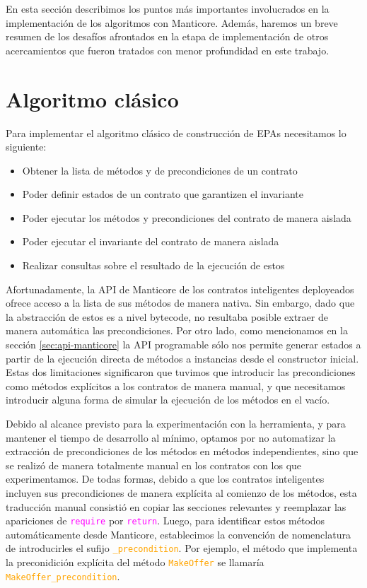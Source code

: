 En esta sección describimos los puntos más importantes involucrados en la implementación de los algoritmos con Manticore.
Además, haremos un breve resumen de los desafíos afrontados en la etapa de implementación de otros acercamientos que fueron tratados con menor profundidad en este trabajo.

\section{Algoritmo clásico}
Para implementar el algoritmo clásico de construcción de EPAs necesitamos lo siguiente:
\begin{itemize}
    \item Obtener la lista de métodos y de precondiciones de un contrato
    \item Poder definir estados de un contrato que garantizen el invariante
    \item Poder ejecutar los métodos y precondiciones del contrato de manera aislada
    \item Poder ejecutar el invariante del contrato de manera aislada
    \item Realizar consultas sobre el resultado de la ejecución de estos
\end{itemize}
Afortunadamente, la API de Manticore de los contratos inteligentes deployeados ofrece acceso a la lista de sus métodos de manera nativa.
Sin embargo, dado que la abstracción de estos es a nivel bytecode, no resultaba posible extraer de manera automática las precondiciones.
Por otro lado, como mencionamos en la sección \ref{sec:api-manticore} la API programable sólo nos permite generar estados a partir de la ejecución directa de métodos a instancias desde el constructor inicial.
Estas dos limitaciones significaron que tuvimos que introducir las precondiciones como métodos explícitos a los contratos de manera manual, y que necesitamos introducir alguna forma de simular la ejecución de los métodos en el vacío.

Debido al alcance previsto para la experimentación con la herramienta, y para mantener el tiempo de desarrollo al mínimo, optamos por no automatizar la extracción de precondiciones de los métodos en métodos independientes, sino que se realizó de manera totalmente manual en los contratos con los que experimentamos.
De todas formas, debido a que los contratos inteligentes incluyen sus precondiciones de manera explícita al comienzo de los métodos, esta traducción manual consistió en copiar las secciones relevantes y reemplazar las apariciones de \textcolor{magenta}{\texttt{require}} por \textcolor{magenta}{\texttt{return}}.
Luego, para identificar estos métodos automáticamente desde Manticore, establecimos la convención de nomenclatura de introducirles el sufijo \textcolor{orange}{\texttt{\_precondition}}.
Por ejemplo, el método que implementa la preconidición explícita del método \textcolor{orange}{\texttt{MakeOffer}} se llamaría \textcolor{orange}{\texttt{MakeOffer\_precondition}}.

